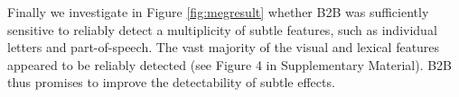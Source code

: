 Finally we investigate in Figure \ref{fig:megresult} whether B2B was sufficiently sensitive to reliably detect a multiplicity of subtle features, such as individual letters and part-of-speech. The vast majority of the visual and lexical features appeared to be reliably detected (see Figure 4 in Supplementary Material). B2B thus promises to improve the detectability of subtle effects.
